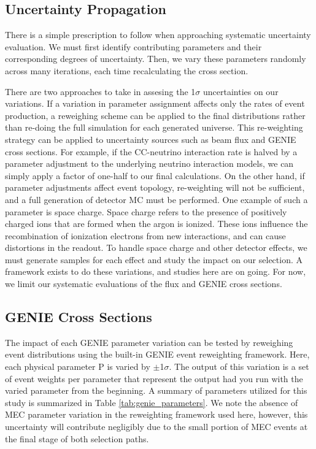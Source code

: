 \subsection{Uncertainty Propagation} 
There is a simple prescription to follow when approaching systematic uncertainty evaluation. We must first identify contributing parameters and their corresponding degrees of uncertainty.  Then, we vary these parameters randomly across many iterations, each time recalculating the cross section.
\par There are two approaches to take in assesing the 1$\sigma$ uncertainties on our variations. If a variation in parameter assignment affects only the rates of event production, a reweighing scheme can be applied to the final distributions rather than re-doing the full simulation for each generated universe.  This re-weighting strategy can be applied to uncertainty sources such as beam flux and GENIE cross sections.  For example, if the CC-neutrino interaction rate is halved by a parameter adjustment to the underlying neutrino interaction models, we can simply apply a factor of one-half to our final calculations.  On the other hand, if parameter adjustments affect event topology, re-weighting will not be sufficient, and a full generation of detector MC must be performed. One example of such a parameter is space charge. Space charge refers to the presence of positively charged ions that are formed when the argon is ionized.  These ions influence the recombination of ionization electrons from new interactions, and can cause distortions in the readout. To handle space charge and other detector effects, we must generate samples for each effect and study the impact on our selection. A framework exists to do these variations, and studies here are on going. For now, we limit our systematic evaluations of the flux and GENIE cross sections.

\subsection{GENIE Cross Sections}
The impact of each GENIE parameter variation can be tested by reweighing event distributions using the built-in GENIE event reweighting framework. Here, each physical parameter P is varied by $\pm$1$\sigma$. The output of this variation is a set of event weights per parameter that represent the output had you run with the varied parameter from the beginning. A summary of parameters utilized for this study is summarized in Table \ref{tab:genie_parameters}. We note the absence of MEC parameter variation in the reweighting framework used here, however, this uncertainty will contribute negligibly due to the small portion of MEC events at the final stage of both selection paths.

